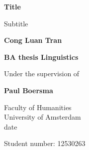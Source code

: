\begin{titlepage}
    \begin{center}
        \vspace*{1cm}
        
        \Huge
        \textbf{Title}
            
        \vspace{0.5cm}
        \LARGE
        Subtitle
            
        \vspace{1.5cm}
            
        \textbf{Cong Luan Tran}
            
        \vfill
        \LARGE
        \textbf{BA thesis Linguistics}\\
        
        \vspace{0.5cm}
        
        \Large 
        Under the supervision of 
        
        \vspace{0.5cm}
        \LARGE
        \textbf{Paul Boersma}
        
        \vspace{0.8cm}
            
            
        \Large
        Faculty of Humanities\\
        University of Amsterdam\\
        date 
        
        \vfill
    \end{center}
\begin{flushright}
Student number: 12530263
\end{flushright}
\end{titlepage}